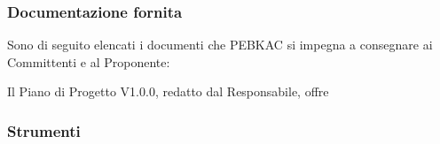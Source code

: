 \subsubsection{Documentazione fornita}
Sono di seguito elencati i documenti che PEBKAC si impegna a consegnare ai Committenti e al Proponente: 

Il Piano di Progetto V1.0.0, redatto dal Responsabile, offre 





\subsubsection{Strumenti}